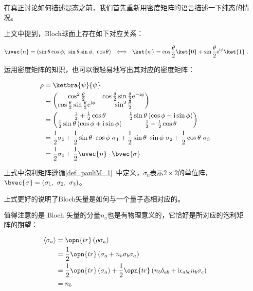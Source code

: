 在真正讨论如何描述混态之前，我们首先重新用密度矩阵的语言描述一下纯态的情况。

上文中提到，Bloch球面上存在如下对应关系：

\begin{equation}
\uvec{n} = \left(  \sin \theta \cos \phi ,~ \sin\theta \sin\phi ,~ \cos\theta  \right) ~\iff~\ket{\psi} = \cos\frac{\theta}{2}\ket{0} + \sin\frac{\theta}{2}\mathrm{e}^{\mathrm{i}\phi}\ket{1}~.
\end{equation}

运用密度矩阵的知识，也可以很轻易地写出其对应的密度矩阵：

\begin{equation}
\begin{aligned}
\rho &= \ketbra{\psi}{\psi} \\
&=  \begin{pmatrix}
    \cos^2\frac{\theta}{2} & \cos\frac{\theta}{2} \sin\frac{\theta}{2}\mathrm{e}^{-\mathrm{i}\phi} \\
    \cos\frac{\theta}{2} \sin\frac{\theta}{2}\mathrm{e}^{\mathrm{i}\phi} & \sin^2\frac{\theta}{2} \\
    \end{pmatrix} \\
&=  \begin{pmatrix}
    \frac{1}{2} + \frac{1}{2}\cos\theta & \frac{1}{2}\sin\theta\left( \cos\phi - \mathrm{i}\sin\phi \right)\\
    \frac{1}{2}\sin\theta\left( \cos\phi + \mathrm{i}\sin\phi \right) & \frac{1}{2} - \frac{1}{2}\cos \theta \\
    \end{pmatrix} \\
&= \frac{1}{2}\sigma_0 + \frac{1}{2}\sin\theta ~\cos\phi~\sigma_1 + \frac{1}{2}\sin\theta ~\sin\phi~\sigma_2 + \frac{1}{2}\cos\theta~\sigma_3 \\
&= \frac{1}{2} \sigma_0 + \frac{1}{2}\uvec{n}\cdot \bvec{\sigma}
\end{aligned}~
\end{equation}

上式中泡利矩阵遵循\autoref{def_pauliM_1}~中定义，$\sigma_0$表示$2\times 2$的单位阵，$\bvec{\sigma} = \left( \sigma_1 ,~\sigma_2,~\sigma_3 \right)$。

上式更好的说明了Bloch矢量是如何与一个量子态相对应的。

值得注意的是 Bloch 矢量的分量$n_a$也是有物理意义的，它恰好是所对应的泡利矩阵的期望：

\begin{equation}\label{eq_Qubit_1}
\begin{aligned}
\left\langle \sigma_a \right\rangle &= \opn{tr}\left( \rho\sigma_a \right) \\
&= \frac{1}{2}\opn{tr}\left( \sigma_a + n_b \sigma_b\sigma_a \right) \\
&= \frac{1}{2}\opn{tr}\left(\sigma_a\right) + \frac{1}{2}\opn{tr}\left( n_b\delta_{ab} + \mathrm{i}\epsilon_{abc}n_b\sigma_c\right) \\
&= n_b
\end{aligned}~
\end{equation}

